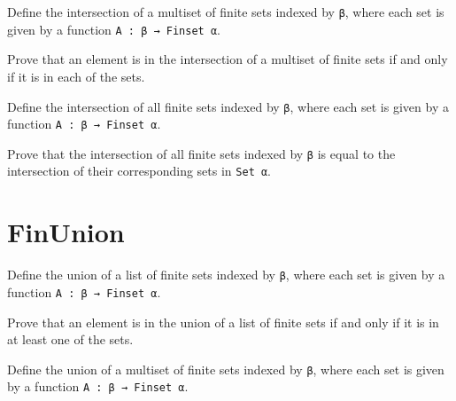 \begin{definition}\label{Multiset.FinInter}
  Define the intersection of a multiset of finite sets indexed by \verb|β|, where each set is given by a function \verb|A : β → Finset α|.
\end{definition}

\begin{lemma}\label{Multiset.eq_FinInter}
  Prove that an element is in the intersection of a multiset of finite sets if and only if it is in each of the sets.
\end{lemma}

\begin{definition}\label{FinInter₀}
  Define the intersection of all finite sets indexed by \verb|β|, where each set is given by a function \verb|A : β → Finset α|.
\end{definition}

\begin{lemma}\label{eq_FinInter₀}
  Prove that the intersection of all finite sets indexed by \verb|β| is equal to the intersection of their corresponding sets in \verb|Set α|.
\end{lemma}

\section{FinUnion}

\begin{definition}\label{List.FinUnion}
  \leanok
  Define the union of a list of finite sets indexed by \verb|β|, where each set is given by a function \verb|A : β → Finset α|.
\end{definition}

\begin{lemma}\label{List.eq_FinUnion}
  Prove that an element is in the union of a list of finite sets if and only if it is in at least one of the sets.
\end{lemma}

\begin{definition}\label{Multiset.FinUnion}
  Define the union of a multiset of finite sets indexed by \verb|β|, where each set is given by a function \verb|A : β → Finset α|.
\end{definition}

